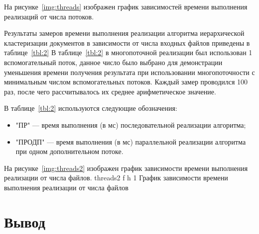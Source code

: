 На рисунке~\ref{img:threads} изображен график зависимостей времени выполнения реализаций от числа потоков.

Результаты замеров времени выполнения реализации алгоритма иерархической кластеризации документов в зависимости от числа входных файлов приведены в таблице~\ref{tbl:2} В таблице~\ref{tbl:2} в многопоточной реализации был использован 1 вспомогательный поток, данное число было выбрано для демонстрации уменьшения времени получения результата при использовании многопоточности с минимальным числом вспомогательных потоков. 
Каждый замер проводился 100 раз, после чего рассчитывалось их среднее арифметическое значение.

В таблице~\ref{tbl:2} используются следующие обозначения:

\begin{itemize}
	\item "ПР" --- время выполнения (в мс) последовательной реализации алгоритма;
	\item "ПРОДП" --- время выполнения (в мс) параллельной реализации алгоритма при одном дополнительном потоке.
\end{itemize}



На рисунке~\ref{img:threads2} изображен график зависимости времени выполнения реализации от числа файлов.
{threads2} %
{f} %
{h} %
{1\textwidth} %
{График зависимости времени выполнения реализации от числа файлов} %
\fi 
\section*{Вывод}

